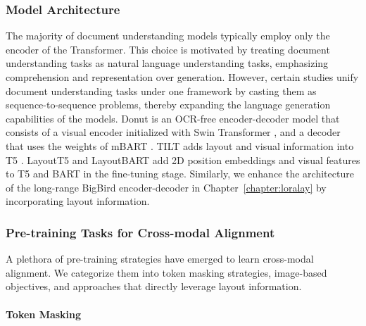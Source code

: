 \subsubsection{Model Architecture}

The majority of document understanding models typically employ only the encoder of the Transformer. This choice is motivated by treating document understanding tasks as natural language understanding tasks, emphasizing comprehension and representation over generation. However, certain studies unify document understanding tasks under one framework by casting them as sequence-to-sequence problems, thereby expanding the language generation capabilities of the models. Donut \citep{kim2022ocr} is an \ac{OCR}-free encoder-decoder model that consists of a visual encoder initialized with Swin Transformer \citep{liu2021swin}, and a decoder that uses the weights of mBART \citep{liu2020multilingual}. TILT \citep{powalski2021going} adds layout and visual information into \ac{T5} \citep{raffel2020exploring}. LayoutT5 and LayoutBART \citep{tanaka2021visualmrc} add 2D position embeddings and visual features to \ac{T5} and \ac{BART} \citep{lewis2019bart} in the fine-tuning stage. Similarly, we enhance the architecture of the long-range BigBird encoder-decoder \citep{zaheer2020big} in Chapter~\ref{chapter:loralay} by incorporating layout information.

\subsubsection{Pre-training Tasks for Cross-modal Alignment}

A plethora of pre-training strategies have emerged to learn cross-modal alignment. We categorize them into token masking strategies, image-based objectives, and approaches that directly leverage layout information.

\paragraph{Token Masking}

